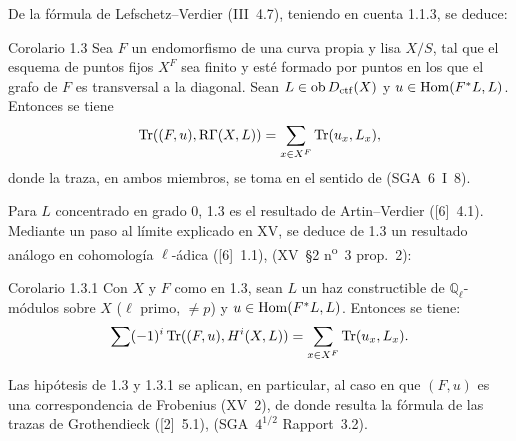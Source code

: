 De la fórmula de Lefschetz--Verdier (III~4.7), teniendo en cuenta 1.1.3, se deduce:

\begin{statement}{Corolario 1.3}
Sea $F$ un endomorfismo de una curva propia y lisa $X/S$, tal que el esquema de puntos fijos $X^F$ sea finito y esté formado por puntos en los que el grafo de $F$ es transversal a la diagonal. Sean $L\in\operatorname{ob} D_{\mathrm{ctf}}(X)$ y $u\in\operatorname{Hom}(F^*L,L)$. Entonces se tiene
\[
\operatorname{Tr}((F,u),\mathrm{R}\Gamma(X,L))=\sum_{x\in X^F}\operatorname{Tr}(u_x,L_x),
\]
donde la traza, en ambos miembros, se toma en el sentido de (SGA~6~I~8).
\end{statement}

Para $L$ concentrado en grado $0$, 1.3 es el resultado de Artin--Verdier ([6]~4.1). Mediante un paso al límite explicado en XV, se deduce de 1.3 un resultado análogo en cohomología $\ell$-ádica ([6]~1.1), (XV~\S2 n\textsuperscript{o}~3 prop.~2):

\begin{statement}{Corolario 1.3.1}
Con $X$ y $F$ como en 1.3, sean $L$ un haz constructible de $\mathbb Q_\ell$-módulos sobre $X$ ($\ell$ primo, $\ne p$) y $u\in\operatorname{Hom}(F^*L,L)$. Entonces se tiene:
\[
\sum(-1)^i\operatorname{Tr}((F,u),H^i(X,L))=\sum_{x\in X^F}\operatorname{Tr}(u_x,L_x).
\]
\end{statement}

Las hipótesis de 1.3 y 1.3.1 se aplican, en particular, al caso en que $(F,u)$ es una correspondencia de Frobenius (XV~2), de donde resulta la fórmula de las trazas de Grothendieck ([2]~5.1), (SGA~$4^{1/2}$ Rapport~3.2).
